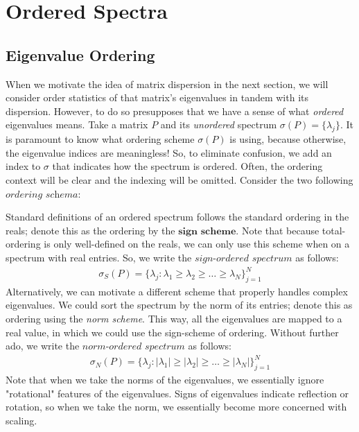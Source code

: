 \section{Ordered Spectra}


\subsection{Eigenvalue Ordering}
When we motivate the idea of matrix dispersion in the next section, we will consider order statistics of that matrix's eigenvalues in tandem with its dispersion. However, to do so presupposes that we have a sense of what \textit{ordered} eigenvalues means. Take a matrix $P$ and its \textit{unordered} spectrum $\sigma(P) = \{\lambda_j\}$. It is paramount to know what ordering scheme $\sigma(P)$ is using, because otherwise, the eigenvalue indices are meaningless! So, to eliminate confusion, we add an index to $\sigma$ that indicates how the spectrum is ordered. Often, the ordering context will be clear and the indexing will be omitted. Consider the two following $\textit{ordering schema}$:

Standard definitions of an ordered spectrum follows the standard ordering in the reals; denote this as the ordering by the $\textbf{sign scheme}$. Note that because total-ordering is only well-defined on the reals, we can only use this scheme when on a spectrum with real entries. So, we write the $\textit{sign-ordered spectrum}$ as follows:
\begin{align*}
\sigma_S(P) = \{\lambda_j : \lambda_1 \geq \lambda_2 \geq \dots \geq \lambda_N\}_{j = 1}^N
\end{align*}
Alternatively, we can motivate a different scheme that properly handles complex eigenvalues. We could sort the spectrum by the norm of its entries; denote this as ordering using the \textit{norm scheme}. This way, all the eigenvalues are mapped to a real value, in which we could use the sign-scheme of ordering. Without further ado, we write the $\textit{norm-ordered spectrum}$ as follows:
\begin{align*}
\sigma_N(P) = \{\lambda_j : |\lambda_1| \geq |\lambda_2| \geq \dots \geq |\lambda_N|\}_{j = 1}^N
\end{align*}
Note that when we take the norms of the eigenvalues, we essentially ignore "rotational" features of the eigenvalues. Signs of eigenvalues indicate reflection or rotation, so when we take the norm, we essentially become more concerned with scaling. 

